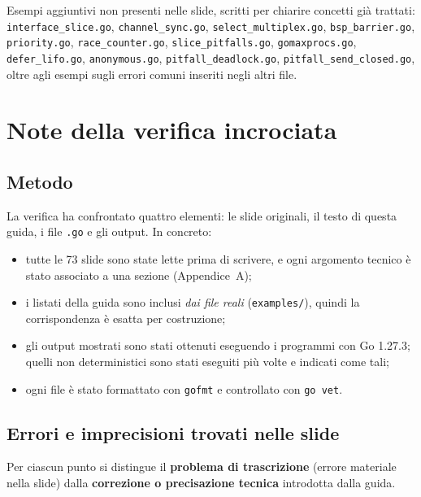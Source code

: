 \documentclass[11pt,a4paper]{report}
\newcommand{\cod}[1]{\texttt{#1}}
\begin{document}
Esempi aggiuntivi non presenti nelle slide, scritti per chiarire concetti già
trattati: \texttt{interface\_slice.go}, \texttt{channel\_sync.go},
\texttt{select\_multiplex.go}, \texttt{bsp\_barrier.go}, \texttt{priority.go},
\texttt{race\_counter.go}, \texttt{slice\_pitfalls.go}, \texttt{gomaxprocs.go},
\texttt{defer\_lifo.go}, \texttt{anonymous.go}, \texttt{pitfall\_deadlock.go},
\texttt{pitfall\_send\_closed.go}, oltre agli esempi sugli errori comuni
inseriti negli altri file.

\chapter{Note della verifica incrociata}

\section{Metodo}

La verifica ha confrontato quattro elementi: le slide originali, il testo di
questa guida, i file \texttt{.go} e gli output. In concreto:

\begin{itemize}
  \item tutte le 73 slide sono state lette prima di scrivere, e ogni argomento
        tecnico è stato associato a una sezione (Appendice~A);
  \item i listati della guida sono inclusi \emph{dai file reali}
        (\texttt{examples/}), quindi la corrispondenza è esatta per costruzione;
  \item gli output mostrati sono stati ottenuti eseguendo i programmi con Go
        1.27.3; quelli non deterministici sono stati eseguiti più volte e
        indicati come tali;
  \item ogni file è stato formattato con \cod{gofmt} e controllato con
        \cod{go vet}.
\end{itemize}

\section{Errori e imprecisioni trovati nelle slide}

Per ciascun punto si distingue il \textbf{problema di trascrizione} (errore
materiale nella slide) dalla \textbf{correzione o precisazione tecnica}
introdotta dalla guida.
\end{document}
